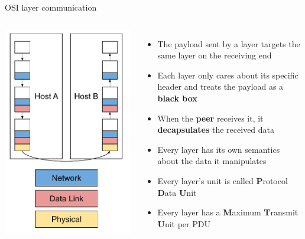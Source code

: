 \begin{frame}{OSI layer communication}
	\begin{columns}
		\includegraphics[width=1.2\textwidth]{slides/networking-stack-overview/osi_encap.pdf}
	\begin{itemize}
		\item The payload sent by a layer targets the same layer on the receiving end
		\item Each layer only cares about its specific header and treats the payload as a \textbf{black box}
		\item When the \textbf{peer} receives it, it \textbf{decapsulates} the received data
		\item Every layer has its own semantics about the data it manipulates
		\item Every layer's unit is called \textbf{P}rotocol \textbf{D}ata \textbf{U}nit
		\item Every layer has a \textbf{M}aximum \textbf{T}ransmit \textbf{U}nit per PDU
	\end{itemize}
	\end{columns}
\end{frame}

